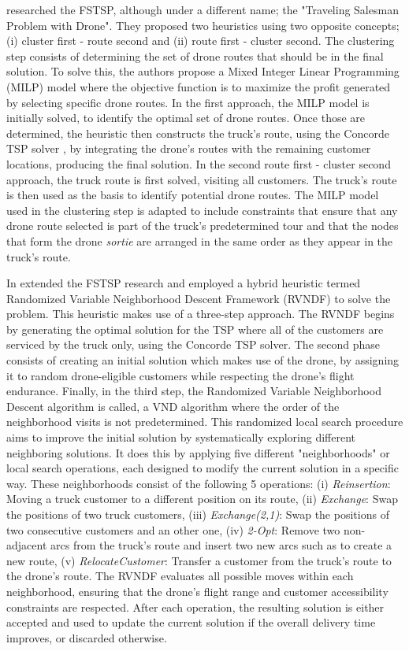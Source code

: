 \documentclass{article}
\begin{document}
	\par
	\citeauthor*{Ha2015} \cite{Ha2015} researched the FSTSP, although under a different name; the "Traveling Salesman Problem with Drone". They proposed two heuristics using two opposite concepts; (i) cluster first - route second and (ii) route first - cluster second. The clustering step consists of determining the set of drone routes that should be in the final solution. To solve this, the authors propose a Mixed Integer Linear Programming (MILP) model where the objective function is to maximize the profit generated by selecting specific drone routes. 
	In the first approach, the MILP model is initially solved, to identify the optimal set of drone routes. Once those are determined, the heuristic then constructs the truck's route, using the Concorde TSP solver \parencite{ConcordeTSP}, by integrating the drone's routes with the remaining customer locations, producing the final solution. In the second route first - cluster second approach, the truck route is first solved, visiting all customers. The truck's route is then used as the basis to identify potential drone routes. The MILP model used in the clustering step is adapted to include constraints that ensure that any drone route selected is part of the truck's predetermined tour and that the nodes that form the drone \textit{sortie} are arranged in the same order as they appear in the truck's route.
	\par
	In \cite{DeFreitas2018} \citeauthor{DeFreitas2018} extended the FSTSP research and employed a hybrid heuristic termed Randomized Variable Neighborhood Descent Framework (RVNDF) to solve the problem. This heuristic makes use of a three-step approach. The RVNDF begins by generating the optimal solution for the TSP where all of the customers are serviced by the truck only, using the Concorde TSP solver. The second phase consists of creating an initial solution which makes use of the drone, by assigning it to random drone-eligible customers while respecting the drone's flight endurance. Finally, in the third step, the Randomized Variable Neighborhood Descent algorithm is called, a VND algorithm where the order of the neighborhood visits is not predetermined. This randomized local search procedure aims to improve the initial solution by systematically exploring different neighboring solutions. It does this by applying five different "neighborhoods" or local search operations, each designed to modify the current solution in a specific way. These neighborhoods consist of the following 5 operations: (i) \textit{Reinsertion}: Moving a truck customer to a different position on its route, (ii) \textit{Exchange}: Swap the positions of two truck customers, (iii) \textit{Exchange(2,1)}: Swap the positions of two consecutive customers and  an other one, (iv) \textit{2-Opt}: Remove two non-adjacent arcs from the truck's route and insert two new arcs such as to create a new route, (v) \textit{RelocateCustomer}: Transfer a customer from the truck's route to the drone's route. The RVNDF evaluates all possible moves within each neighborhood, ensuring that the drone's flight range and customer accessibility constraints are respected. After each operation, the resulting solution is either accepted and used to update the current solution if the overall delivery time improves, or discarded otherwise.
\end{document}
